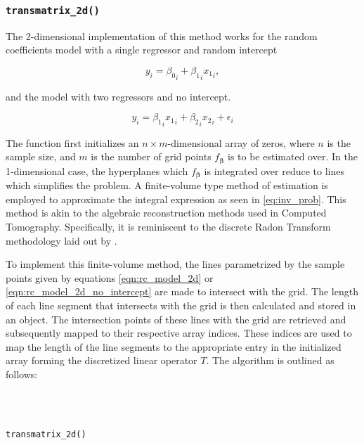 \documentclass[a4paper,12pt]{article}
\newcommand{\bbeta}{{\boldsymbol{\beta}}}
\begin{document}
\subsubsection{\texttt{transmatrix\_2d()}}
The 2-dimensional implementation of this method works for the random coefficients model with a single regressor and random intercept

\begin{equation}
	y_i={\beta_0}_i+{\beta_1}_{i}{x_1}_i,
	\label{eqn:rc_model_2d}
\end{equation}

and the model with two regressors and no intercept.

\begin{equation}
	y_i={\beta_1}_{i}{x_1}_i+{\beta_2}_{i}{x_2}_i+\epsilon_i
	\label{eqn:rc_model_2d_no_intercept}
\end{equation}

The function first initializes an $n \times m$-dimensional array of zeros, where $n$ is the sample size, and $m$ is the  number of grid points $f_\bbeta$ is to be estimated over. In the 1-dimensional case, the hyperplanes which $f_\bbeta$ is integrated over reduce to lines which simplifies the problem. A finite-volume type method of estimation is employed to approximate the integral expression as seen in \ref{eq:inv_prob}. This method is akin to the algebraic reconstruction methods used in Computed Tomography. Specifically, it is reminiscent to the discrete Radon Transform methodology laid out by \cite{beylkin1987discrete}.

To implement this finite-volume method, the lines parametrized by the sample points given by equations \eqref{eqn:rc_model_2d} or \eqref{eqn:rc_model_2d_no_intercept} are made to intersect with the grid. The length of each line segment that intersects with the grid is then calculated and stored in an object. The intersection points of these lines with the grid are retrieved and subsequently mapped to their respective array indices. These indices are used to map the length of the line segments to the appropriate entry in the initialized array forming the discretized linear operator $T$. The algorithm is outlined as follows:\\

\begin{algorithm}[H]
	\SetAlgoLined
	 \\
	\\
	\caption{\texttt{transmatrix\_2d()}}
\end{algorithm}
\end{document}

